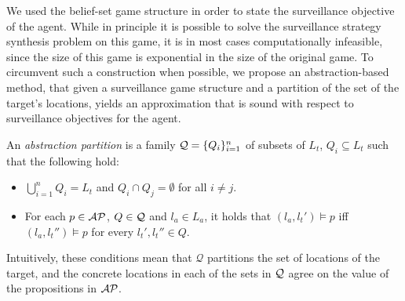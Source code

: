 We used the belief-set game structure in order to state the surveillance objective of the agent. While in principle it is possible to solve the surveillance strategy synthesis problem on this game, it is in most cases computationally infeasible, since the size of this game is exponential in the size of the original game. To circumvent such a construction when possible, we propose an abstraction-based method, that given a surveillance game structure and a partition of the set of the target's locations, yields an approximation that is sound with respect to surveillance objectives for the agent.


An \emph{abstraction partition} is a family $\mathcal{Q} = \{Q_i\}_{i=1}^n$ of subsets of $L_t$, $Q_i \subseteq L_t$ such that the following hold:
\begin{itemize}
\item $\bigcup_{i=1}^n Q_i = L_t$ and $Q_i \cap Q_j = \emptyset$ for all $i \neq j$.
\item For each $p \in \mathcal{AP}$, $Q \in \mathcal{Q}$ and $l_a \in L_a$, it holds that $(l_a,l_t') \models p$ iff $(l_a,l_t'') \models p$ for every $l_t',l_t'' \in Q$.
\end{itemize}
Intuitively, these conditions mean that $\mathcal Q$ partitions the set of locations of the target, and the concrete locations in each of the sets in $\mathcal{Q}$ agree on the value of the  propositions in $\mathcal{AP}$.

